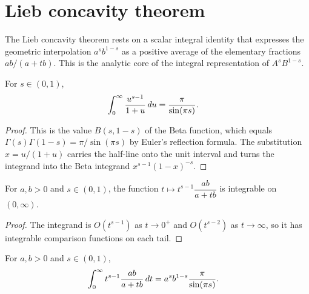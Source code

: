 \section{Lieb concavity theorem}

The Lieb concavity theorem rests on a scalar integral identity that expresses the
geometric interpolation $a^s b^{1-s}$ as a positive average of the elementary
fractions $ab/(a+tb)$. This is the analytic core of the integral representation
of $A^s B^{1-s}$.

\begin{lemma}\label{lem:reflection_integral}
    \leanok
    For $s\in(0,1)$,
    \begin{align}
        \int_0^\infty \frac{u^{s-1}}{1+u}\,du
        &= \frac{\pi}{\sin(\pi s)}.
        \notag
    \end{align}
\end{lemma}

\begin{proof}\leanok
    This is the value $B(s,1-s)$ of the Beta function, which equals
    $\Gamma(s)\Gamma(1-s)=\pi/\sin(\pi s)$ by Euler's reflection formula. The
    substitution $x=u/(1+u)$ carries the half-line onto the unit interval and
    turns the integrand into the Beta integrand $x^{s-1}(1-x)^{-s}$.
\end{proof}

\begin{lemma}\label{lem:lieb_integrand_integrable}
    \leanok
    For $a,b>0$ and $s\in(0,1)$, the function
    $t\mapsto t^{s-1} \dfrac{ab}{a+tb}$ is integrable on $(0,\infty)$.
\end{lemma}

\begin{proof}\leanok
    The integrand is $O(t^{s-1})$ as $t\to0^+$ and $O(t^{s-2})$ as
    $t\to\infty$, so it has integrable comparison functions on each tail.
\end{proof}

\begin{lemma}\label{lem:lieb_integral_value}
    \leanok
    For $a,b>0$ and $s\in(0,1)$,
    \begin{align}
        \int_0^\infty t^{s-1} \frac{ab}{a+tb}\,dt
        &= a^s b^{1-s} \frac{\pi}{\sin(\pi s)}.
        \notag
    \end{align}
\end{lemma}

